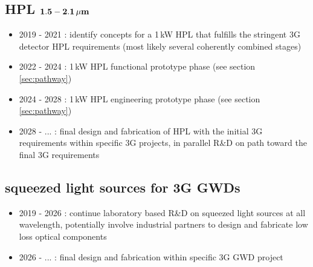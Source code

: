 \subsection*{HPL ${\bf 1.5 - 2.1 \, {\bf \mu m}}$}
\begin{itemize}
	\item 2019 - 2021 : identify concepts for a 1\,kW HPL that fulfills the stringent 3G detector HPL requirements (most likely several coherently combined stages)
	\item 2022 - 2024 : 1\,kW HPL functional prototype phase (see section \ref{sec:pathway})
	\item 2024 - 2028 : 1\,kW HPL engineering prototype phase (see section \ref{sec:pathway})
	\item 2028 - ... : final design and fabrication of HPL with the initial 3G requirements within specific 3G projects, in parallel R\&D on path toward the final 3G requirements
\end{itemize} 


\subsection*{squeezed light sources for 3G GWDs}
\begin{itemize}
	\item 2019 - 2026 : continue laboratory based R\&D on squeezed light sources at all wavelength, potentially involve industrial partners to design and fabricate low loss optical components
	\item 2026 - ... : final design and fabrication within specific 3G GWD project
\end{itemize}


